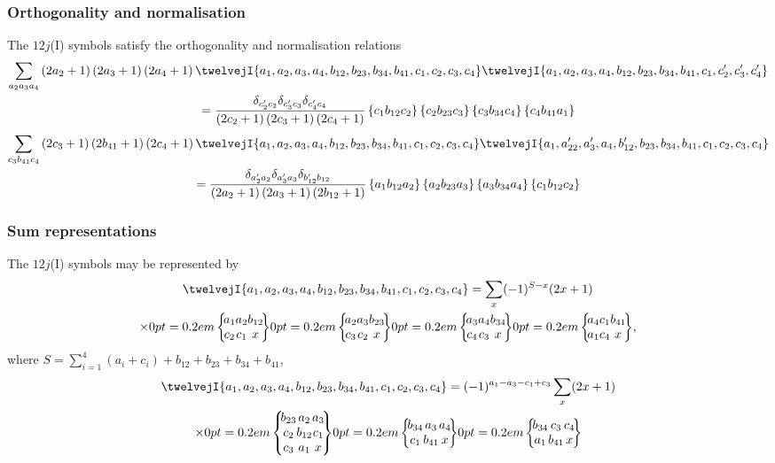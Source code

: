 \subsubsection{Orthogonality and normalisation}
The $12j$(I) symbols satisfy the orthogonality and normalisation relations
\begin{gather}
\sum_{a_{2} a_{3} a_{4}}\left(2 a_{2}+1\right)\left(2 a_{3}+1\right)\left(2 a_{4}+1\right)\twelvejI{a_{1},a_{2},a_{3},a_{4},b_{12},b_{23},b_{34},b_{41},c_{1},c_{2},c_{3},c_{4}}\twelvejI{a_{1},a_{2},a_{3},a_{4},b_{12},b_{23},b_{34},b_{41},c_{1},c_{2}^{\prime},c_{3}^{\prime},c_{4}^{\prime}}  \notag\\
=\frac{\delta_{c_{2}^{\prime} c_{2}} \delta_{c_{3}^{\prime} c_{3}} \delta_{c_{4}^{\prime} c_{4}}}{\left(2 c_{2}+1\right)\left(2 c_{3}+1\right)\left(2 c_{4}+1\right)}\left\{c_{1} b_{12} c_{2}\right\}\left\{c_{2} b_{23} c_{3}\right\}\left\{c_{3} b_{34} c_{4}\right\}\left\{c_{4} b_{41} a_{1}\right\} \label{eq:10:13:4}
\end{gather}
\begin{gather}
\sum_{c_{3} b_{41} c_{4}}\left(2 c_{3}+1\right)\left(2 b_{41}+1\right)\left(2 c_{4}+1\right)\twelvejI{a_{1},a_{2},a_{3},a_{4},b_{12},b_{23},b_{34},b_{41},c_{1},c_{2},c_{3},c_{4}}\twelvejI{a_{1},a_{22}^{\prime},a_{3}^{\prime},a_{4},b_{12}^{\prime},b_{23},b_{34},b_{41},c_{1},c_{2},c_{3},c_{4}}  \notag\\
=\frac{\delta_{a_{2}^{\prime} a_{2}} \delta_{a_{3}^{\prime} a_{3}} \delta_{b_{12}^{\prime} b_{12}}}{\left(2 a_{2}+1\right)\left(2 a_{3}+1\right)\left(2 b_{12}+1\right)}\left\{a_{1} b_{12} a_{2}\right\}\left\{a_{2} b_{23} a_{3}\right\}\left\{a_{3} b_{34} a_{4}\right\}\left\{c_{1} b_{12} c_{2}\right\} \label{eq:10:13:5}
\end{gather}

\subsubsection{Sum representations}
The $12j$(I) symbols may be represented by
\begin{multline}
\twelvejI{a_{1},a_{2},a_{3},a_{4},b_{12},b_{23},b_{34},b_{41},c_{1},c_{2},c_{3},c_{4}}=\sum_{x}(-1)^{S-x}(2 x+1) \\
\times\sixj{a_{1}}{a_{2}}{b_{12}}{c_{2}}{c_{1}}{x}\sixj{a_{2}}{a_{3}}{b_{23}}{c_{3}}{c_{2}}{x}\sixj{a_{3}}{a_{4}}{b_{34}}{c_{4}}{c_{3}}{x}\sixj{a_{4}}{c_{1}}{b_{41}}{a_{1}}{c_{4}}{x}, \label{eq:10:13:6}
\end{multline}
where $S=\sum_{i=1}^{4}\left(a_{i}+c_{i}\right)+b_{12}+b_{23}+b_{34}+b_{41}$,
\begin{multline}
\twelvejI{a_{1},a_{2},a_{3},a_{4},b_{12},b_{23},b_{34},b_{41},c_{1},c_{2},c_{3},c_{4}}=(-1)^{a_{1}-a_{3}-c_{1}+c_{3}} \sum_{x}(2 x+1)  \\
\times\ninej{b_{23}}{a_{2}}{a_{3}}{c_{2}}{b_{12}}{c_{1}}{c_{3}}{a_{1}}{x}\sixj{b_{34}}{a_{3}}{a_{4}}{c_{1}}{b_{41}}{x}\sixj{b_{34}}{c_{3}}{c_{4}}{a_{1}}{b_{41}}{x} \label{eq:10:13:7}
\end{multline}

